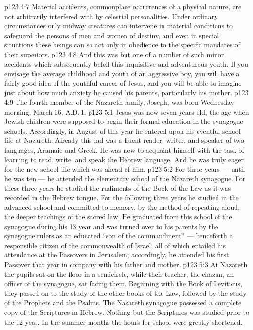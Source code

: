 \vs p123 4:7 Material accidents, commonplace occurrences of a physical nature, are not arbitrarily interfered with by celestial personalities. Under ordinary circumstances only midway creatures can intervene in material conditions to safeguard the persons of men and women of destiny, and even in special situations these beings can so act only in obedience to the specific mandates of their superiors.
\vs p123 4:8 And this was but one of a number of such minor accidents which subsequently befell this inquisitive and adventurous youth. If you envisage the average childhood and youth of an aggressive boy, you will have a fairly good idea of the youthful career of Jesus, and you will be able to imagine just about how much anxiety he caused his parents, particularly his mother.
\vs p123 4:9 \pc The fourth member of the Nazareth family, Joseph, was born Wednesday morning, March 16, A.D.\,1.
\vs p123 5:1 Jesus was now seven years old, the age when Jewish children were supposed to begin their formal education in the synagogue schools. Accordingly, in August of this year he entered upon his eventful school life at Nazareth. Already this lad was a fluent reader, writer, and speaker of two languages, Aramaic and Greek. He was now to acquaint himself with the task of learning to read, write, and speak the Hebrew language. And he was truly eager for the new school life which was ahead of him.
\vs p123 5:2 For three years --- until he was ten --- he attended the elementary school of the Nazareth synagogue. For these three years he studied the rudiments of the Book of the Law as it was recorded in the Hebrew tongue. For the following three years he studied in the advanced school and committed to memory, by the method of repeating aloud, the deeper teachings of the sacred law. He graduated from this school of the synagogue during his 13 year and was turned over to his parents by the synagogue rulers as an educated “son of the commandment” --- henceforth a responsible citizen of the commonwealth of Israel, all of which entailed his attendance at the Passovers in Jerusalem; accordingly, he attended his first Passover that year in company with his father and mother.
\vs p123 5:3 \pc At Nazareth the pupils sat on the floor in a semicircle, while their teacher, the chazan, an officer of the synagogue, sat facing them. Beginning with the Book of Leviticus, they passed on to the study of the other books of the Law, followed by the study of the Prophets and the Psalms. The Nazareth synagogue possessed a complete copy of the Scriptures in Hebrew. Nothing but the Scriptures was studied prior to the 12 year. In the summer months the hours for school were greatly shortened.
